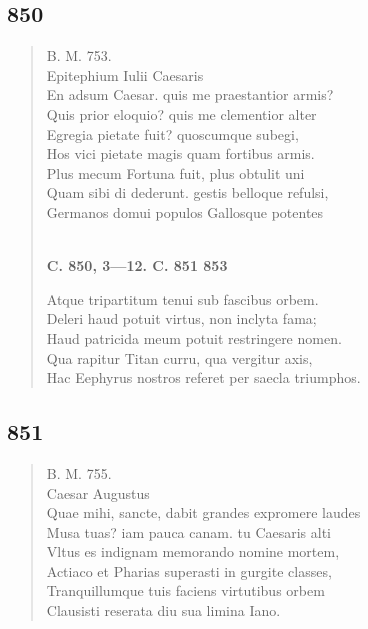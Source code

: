 \documentclass[11pt, a4paper]{report}
\begin{document}
            \subsection*{850}
      \begin{verse}
      B. M. 753. \\ Epitephium Iulii Caesaris \\ En adsum Caesar. quis me praestantior armis? \\ Quis prior eloquio? quis me clementior alter \\ Egregia pietate fuit? quoscumque subegi, \\ Hos vici pietate magis quam fortibus armis. \\ Plus mecum Fortuna fuit, plus obtulit uni \\ Quam sibi di dederunt. gestis belloque refulsi, \\ Germanos domui populos Gallosque potentes \\ 
        ﻿\pagebreak 
    \begin{center} \textbf{C. 850, 3—12. C. 851 853} \end{center} \marginpar{[308]} Atque tripartitum tenui sub fascibus orbem. \\ Deleri haud potuit virtus, non inclyta fama; \\ Haud patricida meum potuit restringere nomen. \\ Qua rapitur Titan curru, qua vergitur axis, \\ Hac Eephyrus nostros referet per saecla triumphos. \\ 
      \end{verse}
  
            \subsection*{851}
      \begin{verse}
      B. M. 755. \\ Caesar Augustus \\ Quae mihi, sancte, dabit grandes expromere laudes \\ Musa tuas? iam pauca canam. tu Caesaris alti \\ Vltus es indignam memorando nomine mortem, \\ Actiaco et Pharias superasti in gurgite classes, \\ Tranquillumque tuis faciens virtutibus orbem \\ Clausisti reserata diu sua limina Iano. \\ 
      \end{verse}
  
\end{document}
